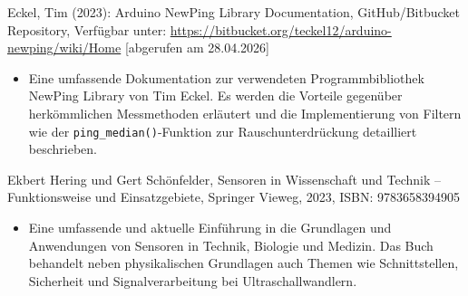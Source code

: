 Eckel, Tim (2023): Arduino NewPing Library Documentation, GitHub/Bitbucket Repository, Verfügbar unter: \url{https://bitbucket.org/teckel12/arduino-newping/wiki/Home} [abgerufen am 28.04.2026]

\begin{itemize}
	\item Eine umfassende Dokumentation zur verwendeten Programmbibliothek NewPing Library von Tim Eckel. Es werden die Vorteile gegenüber herkömmlichen Messmethoden erläutert und die Implementierung von Filtern wie der \texttt{ping\_median()}-Funktion zur Rauschunterdrückung detailliert beschrieben.
\end{itemize}

Ekbert Hering und Gert Schönfelder, Sensoren in Wissenschaft und Technik – Funktionsweise und Einsatzgebiete, Springer Vieweg, 2023, ISBN: 9783658394905 \cite{Ekbert:2023}

\begin{itemize}
	\item Eine umfassende und aktuelle Einführung in die Grundlagen und Anwendungen von Sensoren in Technik, Biologie und Medizin. Das Buch behandelt neben physikalischen Grundlagen auch Themen wie Schnittstellen, Sicherheit und Signalverarbeitung bei Ultraschallwandlern.
\end{itemize}
